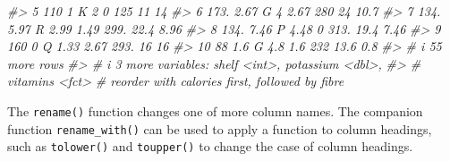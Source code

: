 \documentclass[
]{book}
\newenvironment{Shaded}{\begin{snugshade}}{\end{snugshade}}
\newcommand{\CommentTok}[1]{\textcolor[rgb]{0.56,0.35,0.01}{\textit{#1}}}
\begin{document}
\begin{Shaded}
\begin{Highlighting}[]
\CommentTok{\#\textgreater{}  5     110   1    K        2     0      125   11    14   }
\CommentTok{\#\textgreater{}  6     173.  2.67 G        4     2.67   280   24    10.7 }
\CommentTok{\#\textgreater{}  7     134.  5.97 R        2.99  1.49   299.  22.4   8.96}
\CommentTok{\#\textgreater{}  8     134.  7.46 P        4.48  0      313.  19.4   7.46}
\CommentTok{\#\textgreater{}  9     160   0    Q        1.33  2.67   293.  16    16   }
\CommentTok{\#\textgreater{} 10      88   1.6  G        4.8   1.6    232   13.6   0.8 }
\CommentTok{\#\textgreater{} \# i 55 more rows}
\CommentTok{\#\textgreater{} \# i 3 more variables: shelf \textless{}int\textgreater{}, potassium \textless{}dbl\textgreater{},}
\CommentTok{\#\textgreater{} \#   vitamins \textless{}fct\textgreater{}}
      \CommentTok{\# reorder with calories first, followed by fibre}
\end{Highlighting}
\end{Shaded}

The \texttt{rename()} function changes one of more column names. The companion function \texttt{rename\_with()} can be used to apply a function to column headings, such as \texttt{tolower()} and \texttt{toupper()} to change the case of column headings.
\end{document}
